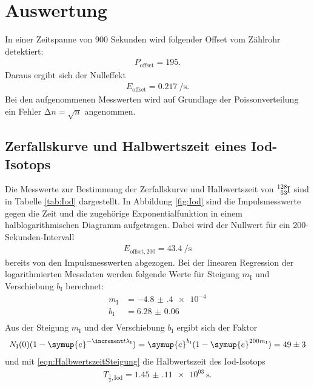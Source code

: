 \section{Auswertung}
\label{sec:Auswertung}

In einer Zeitspanne von 900 Sekunden wird folgender Offset vom Zählrohr
detektiert:
\begin{align*}
  P_\text{offset} = 195.
\end{align*}
Daraus ergibt sich der Nulleffekt
\begin{align*}
  E_\text{offset} = \SI{0.217}{\per\second}.
\end{align*}
Bei den aufgenommenen Messwerten wird auf Grundlage der Poissonverteilung
ein Fehler $\increment n = \sqrt{n}$ angenommen.

\subsection{Zerfallskurve und Halbwertszeit eines Iod-Isotops}

Die Messwerte zur Bestimmung der Zerfallskurve und Halbwertszeit von
$\ce{^{128}_{53}I}$ sind in Tabelle \ref{tab:Iod} dargestellt.
In Abbildung \ref{fig:Iod} sind die Impulsmesswerte gegen die Zeit und die
zugehörige Exponentialfunktion in einem halblogarithmischen Diagramm aufgetragen.
Dabei wird der Nullwert für ein 200-Sekunden-Intervall
\begin{align}
  E_{\text{offset},200} = \SI{43.4}{\per\second}
\end{align}
bereits von
den Impulsmesswerten abgezogen.
Bei der linearen Regression der logarithmierten Messdaten werden folgende Werte
für Steigung $m_\text{I}$ und Verschiebung $b_\text{I}$ berechnet:
\begin{align*}
  m_\text{I} & = -\num{4.8(4)e-4}\\
  b_\text{I} & = \num{6.28(6)}\\
\end{align*}
Aus der Steigung $m_\text{I}$ und der Verschiebung $b_\text{I}$ ergibt sich der Faktor
\begin{align}
  N_\text{I}(0)(1-\symup{e}^{-\increment t \lambda_\text{I}}) = \symup{e}^{b_\text{I}} (1-\symup{e}^{200 {m_\text{I}}})
  = \num{49(3)}
\end{align}
und mit \eqref{eqn:HalbwertszeitSteigung} die Halbwertszeit des Iod-Isotops
\begin{align*}
  T_{\frac{1}{2},\text{Iod}} = \SI{1.45(11)e03}{\second}.
\end{align*}

